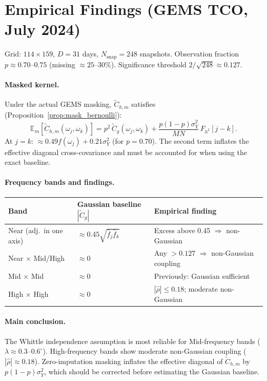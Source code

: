 \documentclass[12pt]{article}
\theoremstyle{definition}
\begin{document}
\section{Empirical Findings (GEMS TCO, July 2024)}
\label{sec:empirical}

Grid: $114\times 159$, $D=31$ days, $N_{\mathrm{snap}}=248$ snapshots.
Observation fraction $p \approx 0.70$--$0.75$ (missing $\approx 25$--$30\%$).
Significance threshold $2/\sqrt{248}\approx0.127$.

\paragraph{Masked kernel.}
Under the actual GEMS masking, $\tilde{C}_{h,m}$ satisfies
(Proposition~\ref{prop:mask_bernoulli}):
\[
  \mathbb{E}_m[\tilde{C}_{h,m}(\omega_j,\omega_k)]
  = p^2\,\tilde{C}_g(\omega_j,\omega_k)
  + \frac{p(1-p)\sigma^2_Y}{MN}\,F_{h^2}[j-k].
\]
At $j=k$: $\approx 0.49 f(\omega_j) + 0.21\sigma^2_Y$ (for $p=0.70$).
The second term inflates the effective diagonal cross-covariance and
must be accounted for when using the exact baseline.

\paragraph{Frequency bands and findings.}

\begin{table}[h!]
\centering
\begin{tabular}{lll}
\toprule
Band & Gaussian baseline $|\tilde{C}_g|$ & Empirical finding \\
\midrule
Near (adj.\ in one axis) & $\approx 0.45\sqrt{\hat{f}_j\hat{f}_k}$
  & Excess above 0.45 $\Rightarrow$ non-Gaussian \\
Near $\times$ Mid/High & $\approx 0$
  & Any $>0.127$ $\Rightarrow$ non-Gaussian coupling \\
Mid $\times$ Mid & $\approx 0$
  & Previously: Gaussian sufficient \\
High $\times$ High & $\approx 0$
  & $|\hat\rho|\leq0.18$; moderate non-Gaussian \\
\bottomrule
\end{tabular}
\end{table}

\paragraph{Main conclusion.}
The Whittle independence assumption is most reliable for Mid-frequency
bands ($\lambda\approx 0.3$--$0.6^\circ$).
High-frequency bands show moderate non-Gaussian coupling
($|\hat\rho|\approx0.18$).
Zero-imputation masking inflates the effective diagonal of
$\tilde{C}_{h,m}$ by $p(1-p)\sigma^2_Y$, which should be corrected
before estimating the Gaussian baseline.
\end{document}
